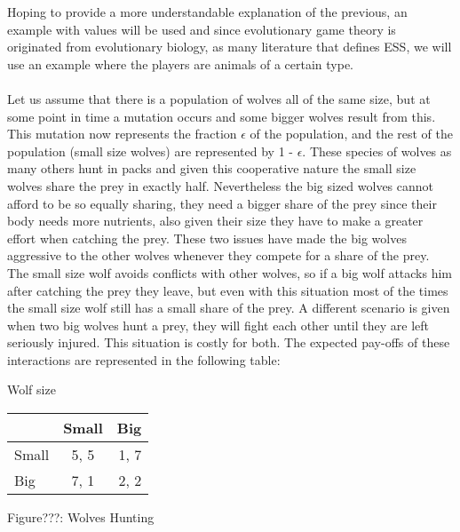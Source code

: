 \documentclass{article}
\begin{document}
Hoping to provide a more understandable explanation of the previous, an example with values will be used and since evolutionary game theory is originated from evolutionary biology, as many literature that defines ESS, we will use an example where the players are animals of a certain type.
\\\\Let us assume that there is a population of wolves all of the same size, but at some point in time a mutation occurs and some bigger wolves result from this. This mutation now represents the fraction $\epsilon$ of the population, and the rest of the population (small size wolves) are represented by 1 - $\epsilon$. These species of wolves as many others hunt in packs and given this cooperative nature the small size wolves share the prey in exactly half. Nevertheless the big sized wolves cannot afford to be so equally sharing, they need a bigger share of the prey since their body needs more nutrients, also given their size they have to make a greater effort when catching the prey. These two issues have made the big wolves aggressive to the other wolves whenever they compete for a share of the prey. The small size wolf avoids conflicts with other wolves, so if a big wolf attacks him after catching the prey they leave, but even with this situation most of the times the small size wolf still has a small share of the prey. A different scenario is given when two big wolves hunt a prey, they will fight each other until they are left seriously injured. This situation is costly for both. The expected pay-offs of these interactions are represented in the following table:
\begin{center}
Wolf size

\begin{tabular}{|l|c|r|}
\hline
 & Small & Big \\ 
\hline
Small & 5, 5 & 1, 7\\
\hline
 Big & 7, 1 & 2, 2\\
\hline
\end{tabular}
\end{center}
\begin{center}
	Figure???: Wolves Hunting
\end{center}
\end{document}
